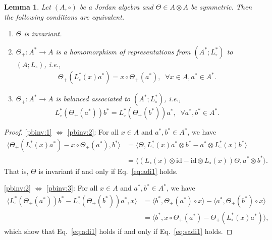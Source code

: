 \documentclass[12pt, reqno, a4paper]{amsart}
\newtheorem{lemma}[theorem]{Lemma}
\theoremstyle{definition}
\newcommand{\id}{\mathrm{id}}
\begin{document}
\begin{lemma}\label{lem:sinvb}
	Let $(A, \circ)$ be a Jordan algebra and $\Theta \in A \otimes A$ be symmetric.
	Then the following conditions are equivalent.
	\begin{enumerate}[label=(\roman*)]
		\item\label{pbinv:1}
		      $\Theta$ is invariant.

		\item\label{pbinv:2}
		      $\Theta_{+}:  A^* \to A$ is a homomorphism of representations from $(A^*; L_{\circ}^*)$ to $(A; L_{\circ})$, i.e.,
		      \begin{align}
			      \Theta_{+}(L_{\circ}^*(x) a^*) = x \circ \Theta_{+}(a^*), \;\; \forall x \in A, a^* \in A^*. \label{eq:adi1}
		      \end{align}

		\item\label{pbinv:3}
		      $\Theta_{+}: A^* \to A$ is balanced associated to $(A^*; L_{\circ}^*)$, i.e.,
		      \begin{equation}
			      L_{\circ}^*(\Theta_+(a^*))b^* = L_{\circ}^*(\Theta_+(b^*))a^*, \;\; \forall a^*,b^* \in A^*. \label{eq:sadi1}
		      \end{equation}
	\end{enumerate}
\end{lemma}
\begin{proof}
	\ref{pbinv:1} $\Longleftrightarrow$ \ref{pbinv:2}: For all $x \in A$ and $a^*, b^* \in A^*$, we have
	\begin{align*}
		\langle \Theta_{+}(L_{\circ}^*(x) a^*) - x \circ \Theta_{+}(a^*), b^*\rangle & = \langle \Theta, L_{\circ}^*(x) a^* \otimes b^* - a^* \otimes L_{\circ}^*(x) b^* \rangle \\
		& = \langle (L_{\circ}(x) \otimes \id - \id \otimes L_{\circ}(x))\Theta, a^* \otimes b^* \rangle.
	\end{align*}
	That is, $\Theta$ is invariant if and only if Eq.~\eqref{eq:adi1} holds.

	\ref{pbinv:2} $\Longleftrightarrow $ \ref{pbinv:3}: For all $x \in A$ and $a^*, b^* \in A^*$, we have
	\begin{align*}
		\langle L_{\circ}^*(\Theta_{+}(a^*)) b^* - L_{\circ}^*(\Theta_{+}(b^*)) a^*, x \rangle & = \langle b^*, \Theta_{+}(a^*) \circ x \rangle - \langle a^*, \Theta_{+}(b^*) \circ x\rangle \\
		& = \langle b^*, x \circ \Theta_{+}(a^*) - \Theta_{+}(L_{\circ}^*(x)a^*) \rangle,
	\end{align*}
	which show that Eq.~\eqref{eq:adi1} holds if and only if Eq.~\eqref{eq:sadi1} holds.
\end{proof}
\end{document}
